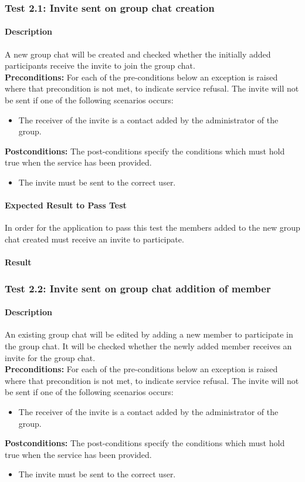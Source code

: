 \documentclass[11pt]{article}
\begin{document}
\subsubsection{Test 2.1: Invite sent on group chat creation}
\paragraph{Description}
 A new group chat will be created and checked whether the initially added participants receive the invite to join the group chat.\\
 \textbf{Preconditions:} For each of the pre-conditions below an exception is raised where that precondition is not met, to indicate service refusal.
 The invite will not be sent if one of the following scenarios occurs:
 \begin{itemize}
 \item The receiver of the invite is a contact added by the administrator of the group.
 \end{itemize}
 \textbf{Postconditions:} The post-conditions specify the conditions which must hold true when the service has been provided.
 \begin{itemize}
 \item The invite must be sent to the correct user.
 \end{itemize}
\paragraph{Expected Result to Pass Test}
In order for the application to pass this test the members added to the new group chat created must receive an invite to participate.
\paragraph{Result}

\subsubsection{Test 2.2: Invite sent on group chat addition of member}
\paragraph{Description}
 An existing group chat will be edited by adding a new member to participate in the group chat. It will be checked whether the newly added member receives an invite for the group chat. \\
  \textbf{Preconditions:} For each of the pre-conditions below an exception is raised where that precondition is not met, to indicate service refusal.
  The invite will not be sent if one of the following scenarios occurs:
  \begin{itemize}
  \item The receiver of the invite is a contact added by the administrator of the group.
  \end{itemize}
  \textbf{Postconditions:} The post-conditions specify the conditions which must hold true when the service has been provided.
  \begin{itemize}
  \item The invite must be sent to the correct user.
  \end{itemize}
\end{document}
